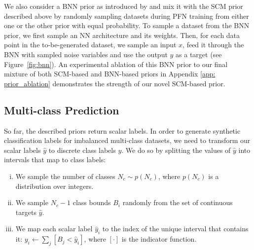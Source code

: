 \documentclass{article}
\begin{document}
We also consider a BNN prior as introduced by \citet{muller-iclr22a} and mix it with the SCM prior described above by randomly sampling datasets during PFN training from either one or the other prior with equal probability.
To sample a dataset from the BNN prior, we first sample an
NN architecture and its weights.
Then, for each data point in the to-be-generated dataset, we sample an input $x$,
feed it through the BNN with sampled noise variables and use the output $y$ as a target (see Figure~\ref{fig:bnn}).
An experimental ablation of this BNN prior 
to our final mixture of both SCM-based and BNN-based priors in Appendix \ref{app: prior_ablation} demonstrates the strength of our novel SCM-based prior. 

\subsection{Multi-class Prediction}
\label{sec:multi-class prediction}
So far, the described priors return scalar labels. In order to generate synthetic classification labels for imbalanced multi-class datasets, we need to transform our scalar labels $\hat{y}$ to discrete class labels $y$. We do so by splitting the values of $\hat{y}$ into intervals that map to class labels:
\vspace{-5mm}\\
\begin{enumerate}[i), itemsep=-0.1em]
    \item We sample the number of classes $N_c \sim p(N_c)$, where $p(N_c)$ is a distribution over integers.
    \item  We sample $N_c-1$ class bounds $B_{i}$ randomly from the set of continuous targets $\hat{y}$. %
    \item We map each scalar label $\hat{y}_i$ to the index of the unique interval that contains it:
    $y_i \gets \sum_{j} [B_j < \hat{y}_i]$, where $[\cdot]$ is the indicator function.
\end{enumerate}
\end{document}
